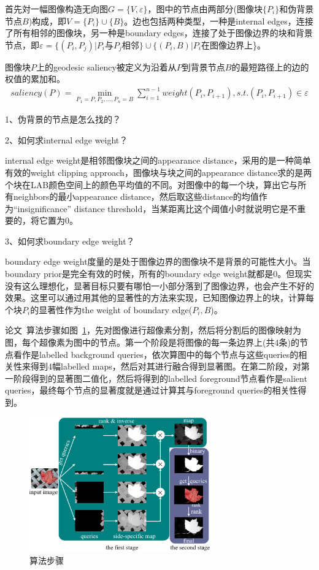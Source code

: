 \documentclass[12pt]{article}
\begin{document}
首先対一幅图像构造无向图$G = \{V, \varepsilon \}$，图中的节点由两部分(图像块$\{P_i\}$和伪背景节点$B$)构成，即$V = \{P_i\}\cup \{B\}$。边也包括两种类型，一种是internal edges，连接了所有相邻的图像块，另一种是boundary edges，连接了处于图像边界的块和背景节点，即$\varepsilon = \{(P_i, P_j)|$$P_i$与$P_j$相邻$\} \cup \{(P_i, B)|$$P_i$在图像边界上\}。

图像块$P$上的geodesic saliency被定义为沿着从$P$到背景节点$B$的最短路径上的边的权值的累加和。
\begin{align}
saliency(P) = \min_{P_1=P, P_2, \ldots, P_n=B}\sum_{i=1}^{n-1}weight(P_i, P_{i+1}), s.t.(P_i, P_{i+1})\in \varepsilon
\end{align}

1、伪背景的节点是怎么找的？

2、如何求internal edge weight？

internal edge weight是相邻图像块之间的appearance distance，采用的是一种简单有效的weight clipping approach，图像块与块之间的appearance distance求的是两个块在LAB颜色空间上的颜色平均值的不同。对图像中的每一个块，算出它与所有neighbors的最小appearance distance，然后取这些distance的均值作为“insignificance” distance threshold，当某距离比这个阈值小时就说明它是不重要的，将它置为0。

3、如何求boundary edge weight？

boundary edge weight度量的是处于图像边界的图像块不是背景的可能性大小。当boundary prior是完全有效的时候，所有的boundary edge weight就都是0。但现实没有这么理想化，显著目标只要有哪怕一小部分落到了图像边界，也会产生不好的效果。这里可以通过用其他的显著性的方法来实现，已知图像边界上的块，计算每个块$P_i$的显著性作为the weight of boundary edge($P_i, B$)。

论文~\cite{yang2013saliency}算法步骤如图~\ref{fig: MR1}，先对图像进行超像素分割，然后将分割后的图像映射为图，每个超像素为图中的节点。第一个阶段是将图像的每一条边界上(共4条)的节点看作是labelled background queries，依次算图中的每个节点与这些queries的相关性来得到4幅labelled maps，然后对其进行融合得到显著图。在第二阶段，对第一阶段得到的显著图二值化，然后将得到的labelled foreground节点看作是salient queries，最终每个节点的显著度就是通过计算其与foreground queries的相关性得到。
\begin{figure}[!ht]
\centering
\includegraphics[width=0.7\textwidth]{MR1.png}
\caption{算法步骤}
\label{fig: MR1}
\end{figure}
\end{document}
